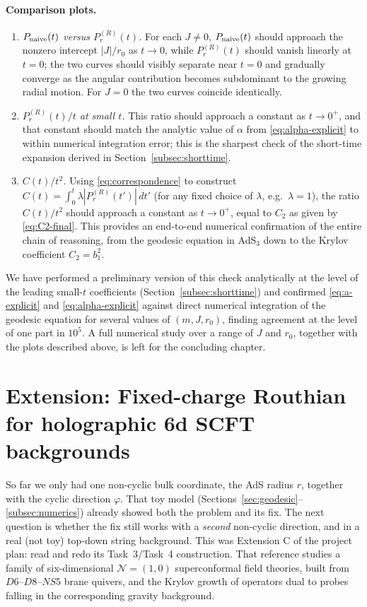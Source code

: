 \documentclass[11pt]{article}
\begin{document}
\paragraph{Comparison plots.}
\begin{enumerate}
\item \emph{$P_{\rm naive}(t)$ versus $P_r^{(R)}(t)$.} For each $J\neq0$, $P_{\rm naive}(t)$ should approach the nonzero intercept $|J|/r_0$ as $t\to0$, while $P_r^{(R)}(t)$ should vanish linearly at $t=0$; the two curves should visibly separate near $t=0$ and gradually converge as the angular contribution becomes subdominant to the growing radial motion. For $J=0$ the two curves coincide identically.
\item \emph{$P_r^{(R)}(t)/t$ at small $t$.} This ratio should approach a constant as $t\to0^+$, and that constant should match the analytic value of $\alpha$ from \eqref{eq:alpha-explicit} to within numerical integration error; this is the sharpest check of the short-time expansion derived in Section~\ref{subsec:shorttime}.
\item \emph{$C(t)/t^2$.} Using \eqref{eq:correspondence} to construct $C(t)=\int_0^t\lambda|P_r^{(R)}(t')|\,dt'$ (for any fixed choice of $\lambda$, e.g.\ $\lambda=1$), the ratio $C(t)/t^2$ should approach a constant as $t\to0^+$, equal to $C_2$ as given by \eqref{eq:C2-final}. This provides an end-to-end numerical confirmation of the entire chain of reasoning, from the geodesic equation in AdS$_3$ down to the Krylov coefficient $C_2=b_1^2$.
\end{enumerate}

We have performed a preliminary version of this check analytically at the level of the leading small-$t$ coefficients (Section~\ref{subsec:shorttime}) and confirmed \eqref{eq:a-explicit} and \eqref{eq:alpha-explicit} against direct numerical integration of the geodesic equation for several values of $(m,J,r_0)$, finding agreement at the level of one part in $10^5$. A full numerical study over a range of $J$ and $r_0$, together with the plots described above, is left for the concluding chapter.



\section{Extension: Fixed-charge Routhian for holographic 6d SCFT backgrounds}
\label{sec:6dSCFT}

So far we only had one non-cyclic bulk coordinate, the AdS radius $r$, together with the cyclic direction $\varphi$. That toy model (Sections~\ref{sec:geodesic}--\ref{subsec:numerics}) already showed both the problem and its fix. The next question is whether the fix still works with a \emph{second} non-cyclic direction, and in a real (not toy) top-down string background. This was Extension C of the project plan: read \cite{Fatemiabhari:2026rob} and redo its Task~3/Task~4 construction. That reference studies a family of six-dimensional $\mathcal N=(1,0)$ superconformal field theories, built from $D6$--$D8$--$NS5$ brane quivers, and the Krylov growth of operators dual to probes falling in the corresponding gravity background.
\end{document}
